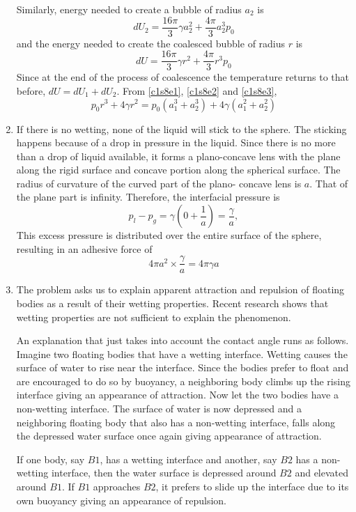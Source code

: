 \begin{enumerate}
\begin{equation}
\end{equation}
Similarly, energy needed to create a bubble of radius $a_2$ is
\begin{equation}\label{c1s8e2}
dU_2 = \frac{16\pi}{3}\gamma a_2^2 + \frac{4\pi}{3} a_2^3p_0
\end{equation}
and the energy needed to create the coalesced bubble of radius $r$ is
\begin{equation}\label{c1s8e3}
dU = \frac{16\pi}{3}\gamma r^2 + \frac{4\pi}{3} r^3p_0
\end{equation}
Since at the end of the process of coalescence the temperature returns to that before, $dU = dU_1 + dU_2$. From \eqref{c1s8e1}, \eqref{c1s8e2} and \eqref{c1s8e3},
\[
p_0 r^3 + 4\gamma r^2=p_0(a_1^3 + a_2^3) + 4\gamma(a_1^2 + a_2^2)
\]

\item If there is no wetting, none of the liquid will stick to the sphere. The sticking happens because of a drop in pressure in the liquid. Since there is no more than a drop of liquid 
available, it forms a plano-concave lens with the plane along the rigid surface and concave portion along the spherical surface. The radius of curvature of the curved part of the plano-
concave lens is $a$. That of the plane part is infinity. Therefore, the interfacial pressure is
\[
p_l - p_g = \gamma\left(0 + \frac{1}{a}\right) = \frac{\gamma}{a},
\]
This excess pressure is distributed over the entire surface of the sphere, resulting in an adhesive force of
\[
4\pi a^2 \times \frac{\gamma}{a} = 4\pi\gamma a
\]

\item The problem asks us to explain apparent attraction and repulsion of floating bodies as a result of their wetting properties. Recent research shows that wetting properties 
\cite{vella2005cheerios} are not sufficient to explain the phenomenon.

An explanation that just takes into account the contact angle runs as follows. Imagine two floating bodies that have a wetting interface. Wetting causes the surface of water to rise
near the interface. Since the bodies prefer to float and are encouraged to do so by buoyancy, a neighboring body climbs up the rising interface giving an appearance of
attraction. Now let the two bodies have a non-wetting interface. The surface of water is now depressed and a neighboring floating body that also has a non-wetting interface, falls
along the depressed water surface once again giving appearance of attraction.

If one body, say $B1$, has a wetting interface and another, say $B2$ has a non-wetting interface, then the water surface is depressed around $B2$ and elevated around $B1$. If
$B1$ approaches $B2$, it prefers to slide up the interface due to its own buoyancy giving an appearance of repulsion.
\end{enumerate}

